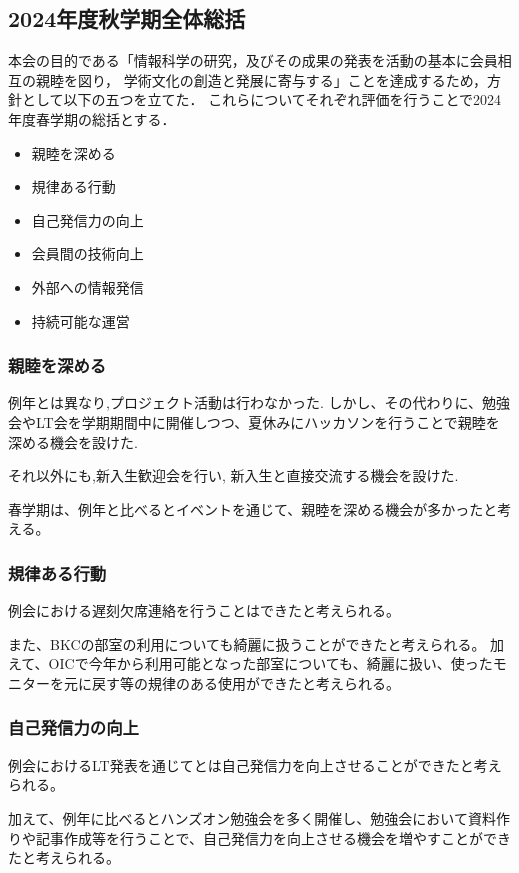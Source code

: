 \subsection*{2024年度秋学期全体総括}


本会の目的である「情報科学の研究，及びその成果の発表を活動の基本に会員相互の親睦を図り，
学術文化の創造と発展に寄与する」ことを達成するため，方針として以下の五つを立てた．
これらについてそれぞれ評価を行うことで2024年度春学期の総括とする．

\begin{itemize}
    \item 親睦を深める
    \item 規律ある行動
    \item 自己発信力の向上
    \item 会員間の技術向上
    \item 外部への情報発信
    \item 持続可能な運営
  \end{itemize}


\subsubsection*{親睦を深める}
例年とは異なり,プロジェクト活動は行わなかった.
しかし、その代わりに、勉強会やLT会を学期期間中に開催しつつ、夏休みにハッカソンを行うことで親睦を深める機会を設けた.

それ以外にも,新入生歓迎会を行い, 新入生と直接交流する機会を設けた.

春学期は、例年と比べるとイベントを通じて、親睦を深める機会が多かったと考える。

\subsubsection*{規律ある行動}
例会における遅刻欠席連絡を行うことはできたと考えられる。

また、BKCの部室の利用についても綺麗に扱うことができたと考えられる。
加えて、OICで今年から利用可能となった部室についても、綺麗に扱い、使ったモニターを元に戻す等の規律のある使用ができたと考えられる。

\subsubsection*{自己発信力の向上}
例会におけるLT発表を通じて\secondGrade{}と\thirdGrade{}は自己発信力を向上させることができたと考えられる。

加えて、例年に比べるとハンズオン勉強会を多く開催し、勉強会において資料作りや記事作成等を行うことで、自己発信力を向上させる機会を増やすことができたと考えられる。